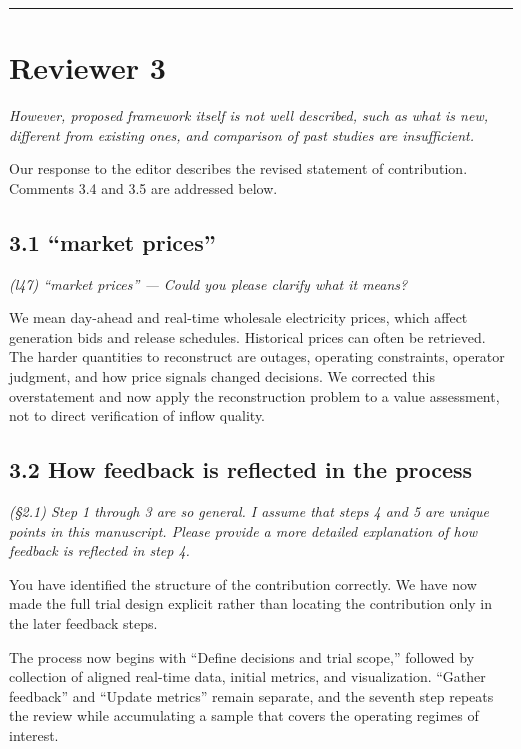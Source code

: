 \documentclass[11pt]{article}
\newenvironment{rc}%
  {\begin{list}{}{\setlength{\leftmargin}{1.5em}\setlength{\rightmargin}{1.5em}%
   \setlength{\topsep}{0.2em}\setlength{\parsep}{0pt}\setlength{\itemsep}{0pt}}%
   \item[]\itshape\color{quotegray}}%
  {\end{list}}
\begin{document}
\vspace{0.4em}
\hrule
\vspace{0.4em}

\section*{Reviewer 3}

\begin{rc}
However, proposed framework itself is not well described, such as what is new, different
from existing ones, and comparison of past studies are insufficient.
\end{rc}

Our response to the editor describes the revised statement of contribution. Comments 3.4 and
3.5 are addressed below.

\subsection*{3.1 ``market prices''}

\begin{rc}
(l47) ``market prices'' --- Could you please clarify what it means?
\end{rc}

We mean day-ahead and real-time wholesale electricity prices, which affect generation bids and
release schedules. Historical prices can often be retrieved. The harder quantities to
reconstruct are outages, operating constraints, operator judgment, and how price signals changed
decisions. We corrected this overstatement and now apply the reconstruction problem to a value
assessment, not to direct verification of inflow quality.

\subsection*{3.2 How feedback is reflected in the process}

\begin{rc}
(\S2.1) Step 1 through 3 are so general. I assume that steps 4 and 5 are unique points in
this manuscript. Please provide a more detailed explanation of how feedback is reflected in
step 4.
\end{rc}

You have identified the structure of the contribution correctly. We have now made the full trial
design explicit rather than locating the contribution only in the later feedback steps.

The process now begins with ``Define decisions and trial scope,'' followed by collection of aligned
real-time data, initial metrics, and visualization. ``Gather feedback'' and ``Update metrics'' remain
separate, and the seventh step repeats the review while accumulating a sample that covers the
operating regimes of interest.
\end{document}
